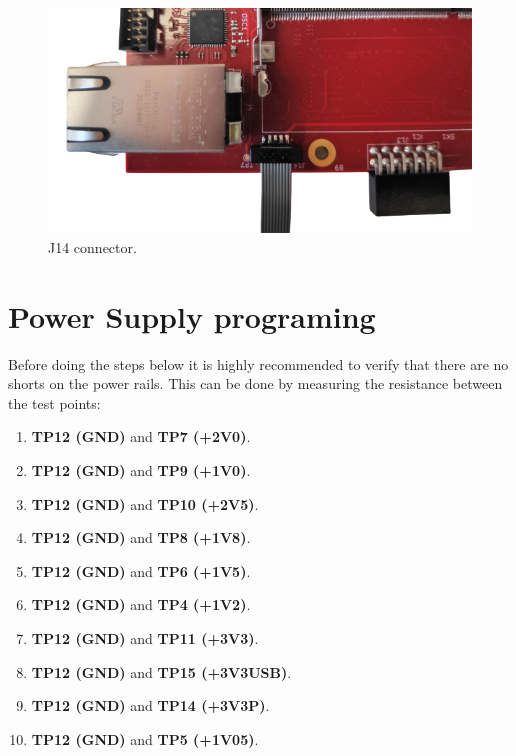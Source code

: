 \documentclass[12pt,oneside,a4]{article}
\begin{document}
\begin{figure}[H]
\begin{center}
\includegraphics[width=0.8\linewidth]{mmcjtag.png}
 \caption{J14 connector. }\label{23}
\end{center}
\end{figure}



\section{Power Supply programing}
Before doing the steps below it is highly recommended to verify that there are no shorts on the power rails. This can be done by measuring the resistance between the test points:

\begin{enumerate}
    \item \textbf{TP12 (GND)} and \textbf{TP7 (+2V0)}.
    \item \textbf{TP12 (GND)} and \textbf{TP9 (+1V0)}.
    \item \textbf{TP12 (GND)} and \textbf{TP10 (+2V5)}.
    \item \textbf{TP12 (GND)} and \textbf{TP8 (+1V8)}.
    \item \textbf{TP12 (GND)} and \textbf{TP6 (+1V5)}.
    \item \textbf{TP12 (GND)} and \textbf{TP4 (+1V2)}.
    \item \textbf{TP12 (GND)} and \textbf{TP11 (+3V3)}.
    \item \textbf{TP12 (GND)} and \textbf{TP15 (+3V3USB)}.
    \item \textbf{TP12 (GND)} and \textbf{TP14 (+3V3P)}.
    \item \textbf{TP12 (GND)} and \textbf{TP5 (+1V05)}.
\end{enumerate}
\end{document}
